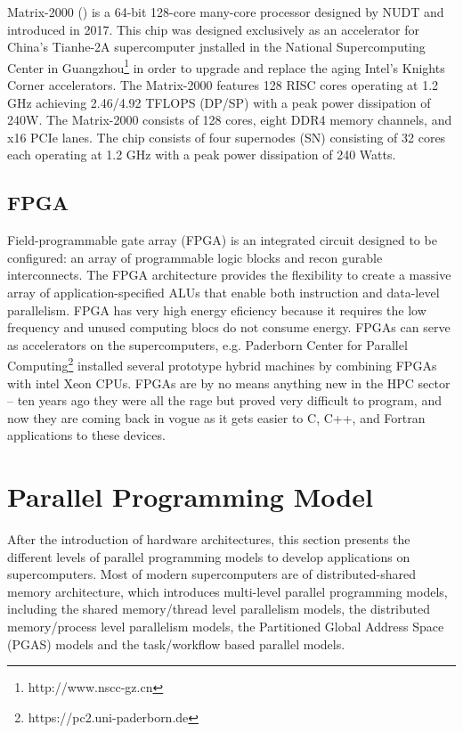 Matrix-2000 (\cite{matrix-2000}) is a 64-bit 128-core many-core processor designed by NUDT and introduced in 2017. This chip was designed exclusively as an accelerator for China's Tianhe-2A supercomputer jnstalled in the National Supercomputing Center in Guangzhou\footnote{http://www.nscc-gz.cn} in order to upgrade and replace the aging Intel's Knights Corner accelerators. The Matrix-2000 features 128 RISC cores operating at 1.2 GHz achieving 2.46/4.92 TFLOPS (DP/SP) with a peak power dissipation of 240W. The Matrix-2000 consists of 128 cores, eight DDR4 memory channels, and x16 PCIe lanes. The chip consists of four supernodes (SN) consisting of 32 cores each operating at 1.2 GHz with a peak power dissipation of 240 Watts.

\subsection{FPGA}

Field-programmable gate array (FPGA) is an integrated circuit designed to be configured: an array of programmable logic blocks and recon gurable interconnects. The FPGA architecture provides the flexibility to create a massive array of application-specified ALUs that enable both instruction and data-level parallelism. FPGA has very high energy eficiency because it requires the low frequency and unused computing blocs do not consume energy. FPGAs can serve as accelerators on the supercomputers, e.g. Paderborn Center for Parallel Computing\footnote{https://pc2.uni-paderborn.de} installed several prototype hybrid machines by combining FPGAs with intel Xeon CPUs. FPGAs are by no means anything new in the HPC sector – ten years ago they were all the rage but proved very difficult to program, and now they are coming back in vogue as it gets easier to C, C++, and Fortran applications to these devices.


\section{Parallel Programming Model}\label{Parallel Programming Model}

After the introduction of hardware architectures, this section presents the different levels of parallel programming models to develop applications on supercomputers. Most of modern supercomputers are of distributed-shared memory architecture, which introduces multi-level parallel programming models, including the shared memory/thread level parallelism models, the distributed memory/process level parallelism models, the Partitioned Global Address Space (PGAS) models and the task/workflow based parallel models.

